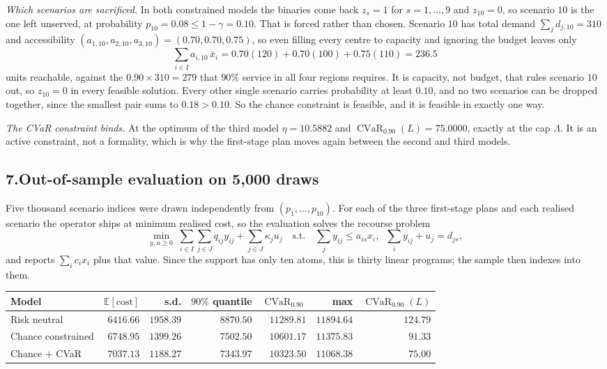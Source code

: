 \documentclass[11pt]{article}
\DeclareMathOperator*{\minimize}{min}
\DeclareMathOperator{\CVaR}{CVaR}
\theoremstyle{definition}\newtheorem*{definition}{Definition}
\theoremstyle{definition}
\begin{document}
\emph{Which scenarios are sacrificed.} In both constrained models the
binaries come back $z_s = 1$ for $s = 1,\dots,9$ and $z_{10} = 0$, so
scenario $10$ is the one left unserved, at probability
$p_{10} = 0.08 \le 1-\gamma = 0.10$. That is forced rather than chosen.
Scenario $10$ has total demand
$\sum_j d_{j,10} = 310$ and accessibility $(a_{1,10}, a_{2,10}, a_{3,10})
= (0.70, 0.70, 0.75)$, so even filling every centre to capacity and
ignoring the budget leaves only
\[
  \sum_{i \in I} a_{i,10}\,\bar{x}_i
  = 0.70(120) + 0.70(100) + 0.75(110) = 236.5
\]
units reachable, against the $0.90 \times 310 = 279$ that $90\%$ service
in all four regions requires. It is capacity, not budget, that rules
scenario $10$ out, so $z_{10} = 0$ in every feasible solution. Every other single scenario carries probability at least $0.10$,
and no two scenarios can be dropped together, since the smallest pair
sums to $0.18 > 0.10$. So the chance constraint is feasible, and it is
feasible in exactly one way.

\emph{The CVaR constraint binds.} At the optimum of the third model
$\eta = 10.5882$ and $\CVaR_{0.90}(L) = 75.0000$, exactly at the cap
$\Lambda$. It is an active constraint, not a formality, which is why the
first-stage plan moves again between the second and third models.

\subsection*{7.\quad Out-of-sample evaluation on 5{,}000 draws}

Five thousand scenario indices were drawn independently from
$(p_1,\dots,p_{10})$. For each of the three first-stage plans and each
realised scenario the operator ships at minimum realised cost, so the
evaluation solves the recourse problem
\[
  \minimize_{y,u \ge 0}\;
  \sum_{i \in I}\sum_{j \in J} q_{ij} y_{ij}
  + \sum_{j \in J} \kappa_j u_j
  \quad\text{s.t.}\quad
  \sum_{j} y_{ij} \le a_{is} x_i,\;\;
  \sum_{i} y_{ij} + u_j = d_{js},
\]
and reports $\sum_i c_i x_i$ plus that value. Since the support has only
ten atoms, this is thirty linear programs; the sample then indexes into
them.

\begin{center}
\begin{tabular}{@{}lrrrrrr@{}}
\toprule
Model & $\mathbb{E}[\text{cost}]$ & s.d. & $90\%$ quantile &
  $\CVaR_{0.90}$ & max & $\CVaR_{0.90}(L)$ \\
\midrule
Risk neutral       & $6416.66$ & $1958.39$ & $8870.50$ & $11289.81$
  & $11894.64$ & $124.79$ \\
Chance constrained & $6748.95$ & $1399.26$ & $7502.50$ & $10601.17$
  & $11375.83$ & $91.33$ \\
Chance $+$ CVaR    & $7037.13$ & $1188.27$ & $7343.97$ & $10323.50$
  & $11068.38$ & $75.00$ \\
\bottomrule
\end{tabular}
\end{center}
\end{document}
